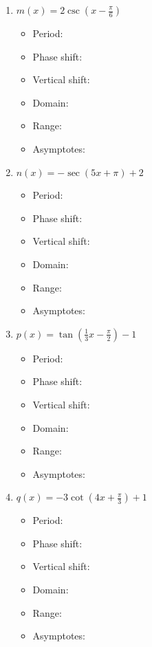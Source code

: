 \documentclass[10pt]{article}
\theoremstyle{definition}
\theoremstyle{plain}
\numberwithin{equation}{section}
\begin{document}
\begin{multicolblock}
\begin{enumerate}
\begin{itemize}
      \item Domain:
      \item Range:
      \item Asymptotes:
    \end{itemize}
    \item $m(x)=2\csc\!\left(x-\tfrac{\pi}{6}\right)$
    \begin{itemize}
      \item Period:
      \item Phase shift:
      \item Vertical shift:
      \item Domain:
      \item Range:
      \item Asymptotes:
    \end{itemize}
    \item $n(x)=-\sec(5x+ \pi)+2$
    \begin{itemize}
      \item Period:
      \item Phase shift:
      \item Vertical shift:
      \item Domain:
      \item Range:
      \item Asymptotes:
    \end{itemize}
    \item $p(x)=\tan\!\left(\tfrac{1}{3}x - \tfrac{\pi}{2}\right)-1$
    \begin{itemize}
      \item Period:
      \item Phase shift:
      \item Vertical shift:
      \item Domain:
      \item Range:
      \item Asymptotes:
    \end{itemize}
    \item $q(x)=-3\cot\!\left(4x + \tfrac{\pi}{3}\right)+1$
    \begin{itemize}
      \item Period:
      \item Phase shift:
      \item Vertical shift:
      \item Domain:
      \item Range:
      \item Asymptotes:
    \end{itemize}
  \end{enumerate}
  \end{multicolblock}
\end{document}
